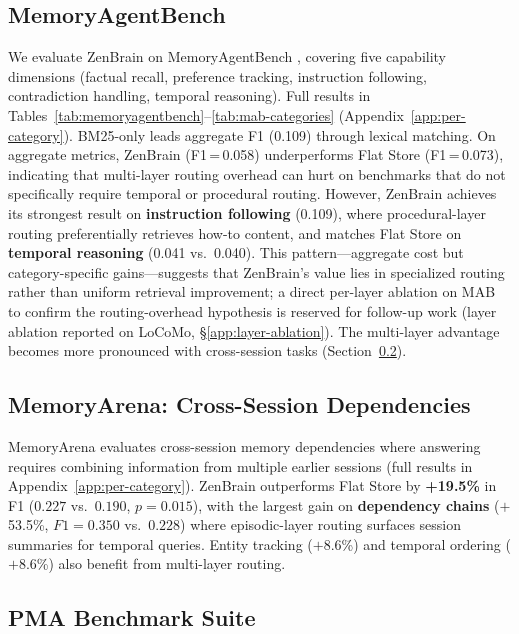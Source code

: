 \documentclass{article}
\begin{document}
\subsection{MemoryAgentBench}
\label{sec:mab}

We evaluate ZenBrain on MemoryAgentBench \citep{he2025memoryagentbench},
covering five capability dimensions (factual recall, preference tracking,
instruction following, contradiction handling, temporal reasoning).
Full results in Tables~\ref{tab:memoryagentbench}--\ref{tab:mab-categories}
(Appendix~\ref{app:per-category}).
BM25-only leads aggregate F1 (0.109) through lexical matching.
On aggregate metrics, ZenBrain (F1\,=\,0.058) underperforms Flat Store
(F1\,=\,0.073), indicating that multi-layer routing overhead can hurt on
benchmarks that do not specifically require temporal or procedural routing.
However, ZenBrain achieves its strongest result on
\textbf{instruction following} (0.109), where procedural-layer routing
preferentially retrieves how-to content, and matches Flat Store on
\textbf{temporal reasoning} (0.041 vs.\ 0.040).
This pattern---aggregate cost but category-specific gains---suggests
that ZenBrain's value lies in specialized routing rather than uniform
retrieval improvement; a direct per-layer ablation on MAB to confirm
the routing-overhead hypothesis is reserved for follow-up work
(layer ablation reported on LoCoMo, \S\ref{app:layer-ablation}).
The multi-layer advantage becomes more pronounced with cross-session
tasks (Section~\ref{sec:memoryarena}).

\subsection{MemoryArena: Cross-Session Dependencies}
\label{sec:memoryarena}

MemoryArena \citep{he2026memoryarena} evaluates cross-session memory
dependencies where answering requires combining information from multiple
earlier sessions (full results in Appendix~\ref{app:per-category}).
ZenBrain outperforms Flat Store by \textbf{+19.5\%} in F1
($0.227$ vs.\ $0.190$, $p = 0.015$), with the largest gain
on \textbf{dependency chains} ($+$53.5\%, $F1 = 0.350$ vs.\ $0.228$)
where episodic-layer routing surfaces session summaries for temporal queries.
Entity tracking ($+$8.6\%) and temporal ordering ($+$8.6\%) also benefit
from multi-layer routing.

\subsection{PMA Benchmark Suite}
\label{app:pma-suite-results}
\end{document}
